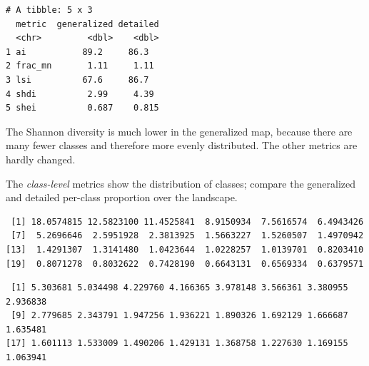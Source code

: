 \documentclass[
  letterpaper,
  DIV=11,
  numbers=noendperiod]{scrartcl}
\newenvironment{Shaded}{\begin{snugshade}}{\end{snugshade}}
\newcommand{\AttributeTok}[1]{\textcolor[rgb]{0.40,0.45,0.13}{#1}}
\newcommand{\ConstantTok}[1]{\textcolor[rgb]{0.56,0.35,0.01}{#1}}
\newcommand{\DecValTok}[1]{\textcolor[rgb]{0.68,0.00,0.00}{#1}}
\newcommand{\FloatTok}[1]{\textcolor[rgb]{0.68,0.00,0.00}{#1}}
\newcommand{\FunctionTok}[1]{\textcolor[rgb]{0.28,0.35,0.67}{#1}}
\newcommand{\NormalTok}[1]{\textcolor[rgb]{0.00,0.23,0.31}{#1}}
\newcommand{\OtherTok}[1]{\textcolor[rgb]{0.00,0.23,0.31}{#1}}
\newcommand{\SpecialCharTok}[1]{\textcolor[rgb]{0.37,0.37,0.37}{#1}}
\newcommand{\StringTok}[1]{\textcolor[rgb]{0.13,0.47,0.30}{#1}}
\begin{document}
\begin{verbatim}
# A tibble: 5 x 3
  metric  generalized detailed
  <chr>         <dbl>    <dbl>
1 ai           89.2     86.3  
2 frac_mn       1.11     1.11 
3 lsi          67.6     86.7  
4 shdi          2.99     4.39 
5 shei          0.687    0.815
\end{verbatim}

The Shannon diversity is much lower in the generalized map, because
there are many fewer classes and therefore more evenly distributed. The
other metrics are hardly changed.

The \emph{class-level} metrics show the distribution of classes; compare
the generalized and detailed per-class proportion over the landscape.

\begin{Shaded}
\end{Shaded}

\begin{verbatim}
 [1] 18.0574815 12.5823100 11.4525841  8.9150934  7.5616574  6.4943426
 [7]  5.2696646  2.5951928  2.3813925  1.5663227  1.5260507  1.4970942
[13]  1.4291307  1.3141480  1.0423644  1.0228257  1.0139701  0.8203410
[19]  0.8071278  0.8032622  0.7428190  0.6643131  0.6569334  0.6379571
\end{verbatim}

\begin{Shaded}
\end{Shaded}

\begin{verbatim}
 [1] 5.303681 5.034498 4.229760 4.166365 3.978148 3.566361 3.380955 2.936838
 [9] 2.779685 2.343791 1.947256 1.936221 1.890326 1.692129 1.666687 1.635481
[17] 1.601113 1.533009 1.490206 1.429131 1.368758 1.227630 1.169155 1.063941
\end{verbatim}
\end{document}
